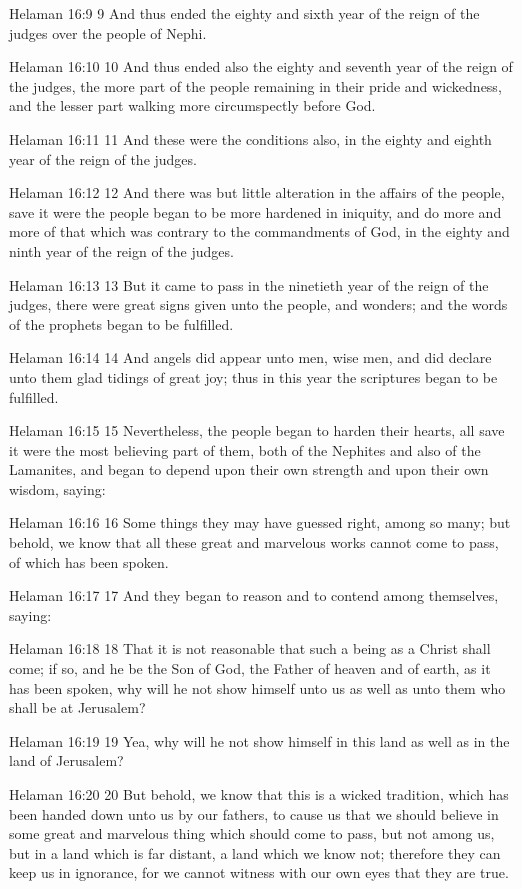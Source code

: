 Helaman 16:9
 9 And thus ended the eighty and sixth year of the reign of the
judges over the people of Nephi.

Helaman 16:10
 10 And thus ended also the eighty and seventh year of the reign
of the judges, the more part of the people remaining in their
pride and wickedness, and the lesser part walking more
circumspectly before God.

Helaman 16:11
 11 And these were the conditions also, in the eighty and eighth
year of the reign of the judges.

Helaman 16:12
 12 And there was but little alteration in the affairs of the
people, save it were the people began to be more hardened in
iniquity, and do more and more of that which was contrary to the
commandments of God, in the eighty and ninth year of the reign of
the judges.

Helaman 16:13
 13 But it came to pass in the ninetieth year of the reign of the
judges, there were great signs given unto the people, and
wonders; and the words of the prophets began to be fulfilled.

Helaman 16:14
 14 And angels did appear unto men, wise men, and did declare
unto them glad tidings of great joy; thus in this year the
scriptures began to be fulfilled.

Helaman 16:15
 15 Nevertheless, the people began to harden their hearts, all
save it were the most believing part of them, both of the
Nephites and also of the Lamanites, and began to depend upon
their own strength and upon their own wisdom, saying:

Helaman 16:16
 16 Some things they may have guessed right, among so many; but
behold, we know that all these great and marvelous works cannot
come to pass, of which has been spoken.

Helaman 16:17
 17 And they began to reason and to contend among themselves,
saying:

Helaman 16:18
 18 That it is not reasonable that such a being as a Christ shall
come; if so, and he be the Son of God, the Father of heaven and
of earth, as it has been spoken, why will he not show himself
unto us as well as unto them who shall be at Jerusalem?

Helaman 16:19
 19 Yea, why will he not show himself in this land as well as in
the land of Jerusalem?

Helaman 16:20
 20 But behold, we know that this is a wicked tradition, which
has been handed down unto us by our fathers, to cause us that we
should believe in some great and marvelous thing which should
come to pass, but not among us, but in a land which is far
distant, a land which we know not; therefore they can keep us in
ignorance, for we cannot witness with our own eyes that they are
true.

